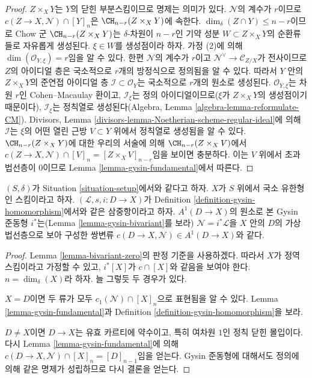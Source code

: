 \begin{proof}
$Z \times_X Y$는 $Y$의 닫힌 부분스킴이므로 명제는 의미가 있다.
$\mathcal{N}$의 계수가 $r$이므로
$c(Z \to X, \mathcal{N}) \cap [Y]_n$은
$\CH_{n - r}(Z \times_X Y)$에 속한다. $\dim_\delta(Z \cap Y) \leq n - r$이므로
Chow 군 $\CH_{n - r}(Z \times_X Y)$는 $\delta$-차원이 $n - r$인 기약
성분 $W \subset Z \times_X Y$의 순환류들로 자유롭게 생성된다.
$\xi \in W$를 생성점이라 하자. 가정 (2)에 의해
$\dim(\mathcal{O}_{Y, \xi}) = r$임을 알 수 있다. 한편
$\mathcal{N}$의 계수가 $r$이고
$\mathcal{N}^\vee \to \mathcal{C}_{Z/X}$가 전사이므로 $Z$의
아이디얼 층은 국소적으로 $r$개의 방정식으로 정의됨을 알 수 있다.
따라서 $Y$ 안의 $Z \times_X Y$의 준연접 아이디얼 층
$\mathcal{I} \subset \mathcal{O}_Y$는 국소적으로 $r$개의 원소로
생성된다. $\mathcal{O}_{Y, \xi}$는 차원 $r$인 Cohen--Macaulay 환이고,
$\mathcal{I}_\xi$는 정의 아이디얼이므로($\xi$가
$Z \times_X Y$의 생성점이기 때문이다), $\mathcal{I}_\xi$는 정칙열로
생성된다(Algebra, Lemma \ref{algebra-lemma-reformulate-CM}).
Divisors, Lemma \ref{divisors-lemma-Noetherian-scheme-regular-ideal}에
의해 $\mathcal{I}$는 $\xi$의 어떤 열린 근방 $V \subset Y$ 위에서
정칙열로 생성됨을 알 수 있다. $\CH_{n - r}(Z \times_X Y)$에 대한
우리의 서술에 의해 $\CH_{n - r}(Z \times_X V)$에서
$c(Z \to X, \mathcal{N}) \cap [V]_n = [Z \times_X V]_{n - r}$임을
보이면 충분하다. 이는 $V$ 위에서 초과 법선층이 $0$이므로 Lemma
\ref{lemma-gysin-fundamental}에서 따른다.
\end{proof}

\begin{lemma}
\label{lemma-gysin-agrees}
$(S, \delta)$가 Situation \ref{situation-setup}에서와 같다고 하자.
$X$가 $S$ 위에서 국소 유한형인 스킴이라고 하자.
$(\mathcal{L}, s, i : D \to X)$가 Definition
\ref{definition-gysin-homomorphism}에서와 같은 삼중항이라고 하자.
$A^1(D \to X)$의 원소로 본 Gysin 준동형 $i^*$는(Lemma
\ref{lemma-gysin-bivariant}를 보라) $\mathcal{N} = i^*\mathcal{L}$을
$X$ 안의 $D$의 가상 법선층으로 보아 구성한 쌍변류
$c(D \to X, \mathcal{N}) \in A^1(D \to X)$와 같다.
\end{lemma}

\begin{proof}
Lemma \ref{lemma-bivariant-zero}의 판정 기준을 사용하겠다. 따라서
$X$가 정역 스킴이라고 가정할 수 있고, $i^*[X]$가
$c \cap [X]$와 같음을 보여야 한다. $n = \dim_\delta(X)$라 하자.
늘 그렇듯 두 경우가 있다.

\medskip\noindent
$X = D$이면 두 류가 모두 $c_1(\mathcal{N}) \cap [X]_n$으로 표현됨을
알 수 있다. Lemma \ref{lemma-gysin-fundamental}과 Definition
\ref{definition-gysin-homomorphism}을 보라.

\medskip\noindent
$D \not = X$이면 $D \to X$는 유효 카르티에 약수이고, 특히 여차원
$1$인 정칙 닫힌 몰입이다. 다시 Lemma
\ref{lemma-gysin-fundamental}에 의해
$c(D \to X, \mathcal{N}) \cap [X]_n = [D]_{n - 1}$임을 얻는다.
Gysin 준동형에 대해서도 정의에 의해 같은 명제가 성립하므로 다시
결론을 얻는다.
\end{proof}

